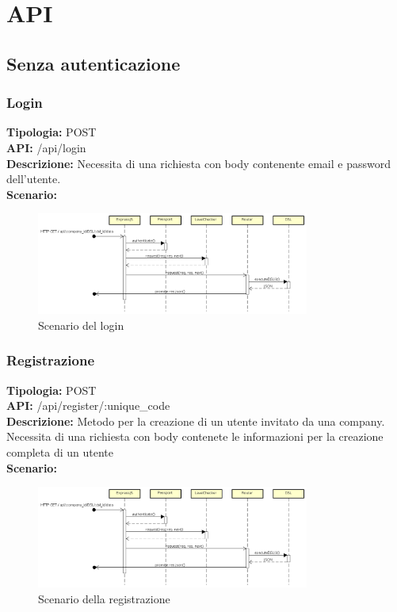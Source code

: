 \section{API}
\subsection{Senza autenticazione}
\subsubsection{Login}
\textbf{Tipologia:} POST \\
\textbf{API:} /api/login \\
\textbf{Descrizione:} Necessita di una richiesta con body contenente email e password dell'utente. \\
\textbf{Scenario:} 
\begin{figure}[h]
\centering
\includegraphics[width=0.8\textwidth]{res/sections/backend/(POST)login.png}
\caption{Scenario del login}
\end{figure}

\newpage
\subsubsection{Registrazione}
\textbf{Tipologia:} POST \\
\textbf{API:} /api/register/:unique\_code \\
\textbf{Descrizione:} Metodo per la creazione di un utente invitato da una company. Necessita di una richiesta con body contenete le informazioni per la creazione completa di un utente \\
\textbf{Scenario:} 
\begin{figure}[h]
\centering
\includegraphics[width=0.8\textwidth]{res/sections/backend/(POST)register.png}
\caption{Scenario della registrazione}
\end{figure}

